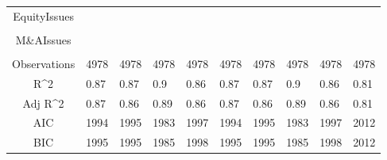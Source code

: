 \documentclass{article}
\begin{document}
\begin{table}[H]
\begin{tabular}{|clllllllll|}
  EquityIssues &  &  &  &  &  &  &  &  &  \\ 
   &  &  &  &  &  &  &  &  &  \\ 
  M\&AIssues &  &  &  &  &  &  &  &  &  \\ 
   &  &  &  &  &  &  &  &  &  \\ 
  \hline 
 Observations & 4978 & 4978 & 4978 & 4978 & 4978 & 4978 & 4978 & 4978 & 4978 \\ 
  R^2 & 0.87 & 0.87 & 0.9 & 0.86 & 0.87 & 0.87 & 0.9 & 0.86 & 0.81 \\ 
  Adj R^2 & 0.87 & 0.86 & 0.89 & 0.86 & 0.87 & 0.86 & 0.89 & 0.86 & 0.81 \\ 
  AIC & 1994 & 1995 & 1983 & 1997 & 1994 & 1995 & 1983 & 1997 & 2012 \\ 
  BIC & 1995 & 1995 & 1985 & 1998 & 1995 & 1995 & 1985 & 1998 & 2012 \\ 
   \hline
\end{tabular}
 
\end{table}
\end{document}
